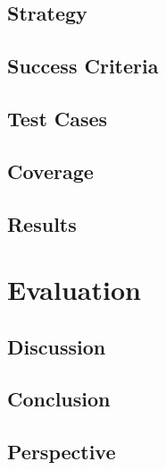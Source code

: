 		\section{Strategy}
		\section{Success Criteria}
		\section{Test Cases}
		\section{Coverage}
		\section{Results}
	
	\chapter{Evaluation}
		\section{Discussion}
		\section{Conclusion}
		\section{Perspective}
	
	\cleardoublepage
{}
\label{chap:bib}

\listoffigures
\lstlistoflistings

\appendix	

